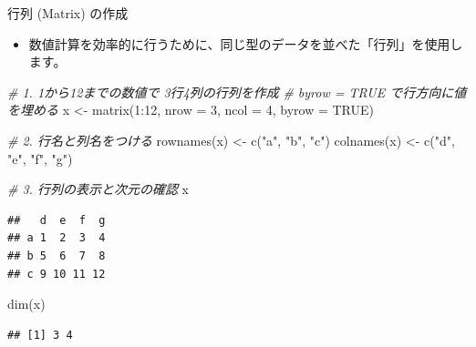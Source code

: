 \documentclass[
  ignorenonframetext,
]{beamer}
\newenvironment{Shaded}{\begin{snugshade}}{\end{snugshade}}
\newcommand{\AttributeTok}[1]{\textcolor[rgb]{0.77,0.63,0.00}{#1}}
\newcommand{\CommentTok}[1]{\textcolor[rgb]{0.56,0.35,0.01}{\textit{#1}}}
\newcommand{\ConstantTok}[1]{\textcolor[rgb]{0.00,0.00,0.00}{#1}}
\newcommand{\DecValTok}[1]{\textcolor[rgb]{0.00,0.00,0.81}{#1}}
\newcommand{\FunctionTok}[1]{\textcolor[rgb]{0.00,0.00,0.00}{#1}}
\newcommand{\NormalTok}[1]{#1}
\newcommand{\OtherTok}[1]{\textcolor[rgb]{0.56,0.35,0.01}{#1}}
\newcommand{\SpecialCharTok}[1]{\textcolor[rgb]{0.00,0.00,0.00}{#1}}
\newcommand{\StringTok}[1]{\textcolor[rgb]{0.31,0.60,0.02}{#1}}
\providecommand{\tightlist}{%
  \setlength{\itemsep}{0pt}\setlength{\parskip}{0pt}}
\begin{document}
\begin{frame}[fragile]{行列 (Matrix) の作成}
\protect\hypertarget{ux884cux5217-matrix-ux306eux4f5cux6210}{}
\begin{itemize}
\tightlist
\item
  数値計算を効率的に行うために、同じ型のデータを並べた「行列」を使用します。
\end{itemize}

\scriptsize

\begin{Shaded}
\begin{Highlighting}[]
\CommentTok{\# 1. 1から12までの数値で 3行4列の行列を作成}
\CommentTok{\# byrow = TRUE で行方向に値を埋める}
\NormalTok{x }\OtherTok{\textless{}{-}} \FunctionTok{matrix}\NormalTok{(}\DecValTok{1}\SpecialCharTok{:}\DecValTok{12}\NormalTok{, }\AttributeTok{nrow =} \DecValTok{3}\NormalTok{, }\AttributeTok{ncol =} \DecValTok{4}\NormalTok{, }\AttributeTok{byrow =} \ConstantTok{TRUE}\NormalTok{)}

\CommentTok{\# 2. 行名と列名をつける}
\FunctionTok{rownames}\NormalTok{(x) }\OtherTok{\textless{}{-}} \FunctionTok{c}\NormalTok{(}\StringTok{"a"}\NormalTok{, }\StringTok{"b"}\NormalTok{, }\StringTok{"c"}\NormalTok{)}
\FunctionTok{colnames}\NormalTok{(x) }\OtherTok{\textless{}{-}} \FunctionTok{c}\NormalTok{(}\StringTok{"d"}\NormalTok{, }\StringTok{"e"}\NormalTok{, }\StringTok{"f"}\NormalTok{, }\StringTok{"g"}\NormalTok{)}

\CommentTok{\# 3. 行列の表示と次元の確認}
\NormalTok{x}
\end{Highlighting}
\end{Shaded}

\begin{verbatim}
##   d  e  f  g
## a 1  2  3  4
## b 5  6  7  8
## c 9 10 11 12
\end{verbatim}

\begin{Shaded}
\begin{Highlighting}[]
\FunctionTok{dim}\NormalTok{(x)}
\end{Highlighting}
\end{Shaded}

\begin{verbatim}
## [1] 3 4
\end{verbatim}

\normalsize
\end{frame}
\end{document}
